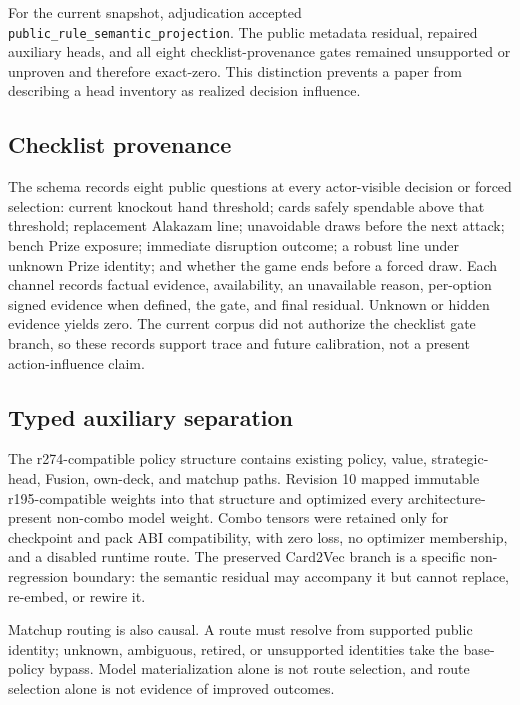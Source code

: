 For the current snapshot, adjudication accepted
\texttt{public\_rule\_semantic\_projection}. The public metadata residual,
repaired auxiliary heads, and all eight checklist-provenance gates remained
unsupported or unproven and therefore exact-zero. This distinction prevents a
paper from describing a head inventory as realized decision influence.

\subsection{Checklist provenance}

The schema records eight public questions at every actor-visible decision or
forced selection: current knockout hand threshold; cards safely spendable above
that threshold; replacement Alakazam line; unavoidable draws before the next
attack; bench Prize exposure; immediate disruption outcome; a robust line under
unknown Prize identity; and whether the game ends before a forced draw. Each
channel records factual evidence, availability, an unavailable reason,
per-option signed evidence when defined, the gate, and final residual. Unknown
or hidden evidence yields zero. The current corpus did not authorize the
checklist gate branch, so these records support trace and future calibration,
not a present action-influence claim.

\subsection{Typed auxiliary separation}

The r274-compatible policy structure contains existing policy, value,
strategic-head, Fusion, own-deck, and matchup paths. Revision 10 mapped immutable
r195-compatible weights into that structure and optimized every
architecture-present non-combo model weight. Combo tensors were retained only
for checkpoint and pack ABI compatibility, with zero loss, no optimizer
membership, and a disabled runtime route. The preserved Card2Vec branch is a
specific non-regression boundary: the semantic residual may accompany it but
cannot replace, re-embed, or rewire it.

Matchup routing is also causal. A route must resolve from supported public
identity; unknown, ambiguous, retired, or unsupported identities take the
base-policy bypass. Model materialization alone is not route selection, and
route selection alone is not evidence of improved outcomes.
